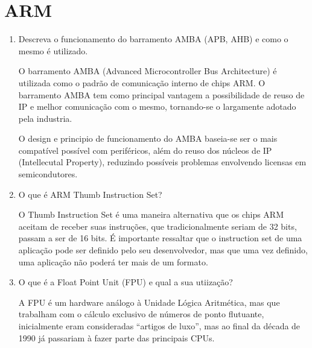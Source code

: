 \documentclass[11pt]{article}
\begin{document}
\section{ARM}
\label{sec:orgheadline2}
\begin{enumerate}
  \item Descreva o funcionamento do barramento AMBA (APB, AHB) e como o mesmo é
    utilizado.

    O barramento AMBA (Advanced Microcontroller Bus Architecture) é utilizada
    como o padrão de comunicação interno de chips ARM. O barramento AMBA tem
    como principal vantagem a possibilidade de reuso de IP e melhor comunicação
    com o mesmo, tornando-se o largamente adotado pela industria.

    O design e principio de funcionamento do AMBA baseia-se ser o mais
    compatível possível com periféricos, além do reuso dos núcleos de IP
    (Intellecutal Property),
    reduzindo possíveis problemas envolvendo licensas em semicondutores.

  \item O que é ARM Thumb Instruction Set?

    O Thumb Instruction Set é uma maneira alternativa que os chips ARM aceitam
    de receber suas instruções, que tradicionalmente seriam de 32 bits, passam a
    ser de 16 bits. É importante ressaltar que o instruction set de uma
    aplicação pode ser definido pelo seu desenvolvedor, mas que uma vez
    definido, uma aplicação não poderá ter mais de um formato.

  \item O que é a Float Point Unit (FPU) e qual a sua utiização?

    A FPU é um hardware análogo à Unidade Lógica Aritmética, mas que trabalham
    com o cálculo exclusivo de números de ponto flutuante, inicialmente eram
    consideradas ``artigos de luxo'', mas ao final da década de 1990 já
    passariam à fazer parte das principais CPUs.

\end{enumerate}
\end{document}
